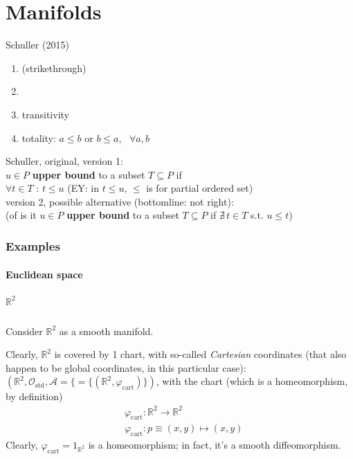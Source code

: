 \part{Manifolds}


Schuller (2015) \cite{dgdt:Schu2015}

\begin{enumerate}
	\item (strikethrough)
	\item 
	\item transitivity
	\item totality: $a\leq b$ or $b\leq a$, \, $\forall a, b$
\end{enumerate}

\begin{definition}

Schuller, original, version 1: \\
$u \in P$ \textbf{upper bound} to a subset $T\subseteq P$ if \\
$\forall t \in T$ : $t\leq u$ (EY: in $t\leq u$, $\leq$ is for partial ordered set) \\

version 2, possible alternative (bottomline: not right): \\
(of is it $u\in P$ \textbf{upper bound} to a subset $T \subseteq P$ if $\nexists \, t\in T$ s.t. $u\leq t$)

\end{definition}

\section{Examples}

\subsection{Euclidean space}

\subsubsection{$\mathbb{R}^2$}

Consider $\mathbb{R}^2$ as a smooth manifold.  

Clearly, $\mathbb{R}^2$ is covered by 1 chart, with so-called \emph{Cartesian} coordinates (that also happen to be global coordinates, in this particular case): $(\mathbb{R}^2, \mathcal{O}_{\text{std}}, \mathcal{A} = \lbrace = \lbrace (\mathbb{R}^2, \varphi_{\text{cart}} ) \rbrace )$, with the chart (which is a homeomorphism, by definition)
\[
\begin{aligned}
	& \varphi_{\text{cart}} : \mathbb{R}^2 \to \mathbb{R}^2 \\ 
	& \varphi_{\text{cart}} : p \equiv (x,y) \mapsto (x,y)
\end{aligned}
\]
Clearly, $\varphi_{\text{cart}} = 1_{\mathbb{R}^2}$ is a homeomorphism; in fact, it's a smooth diffeomorphism.  

